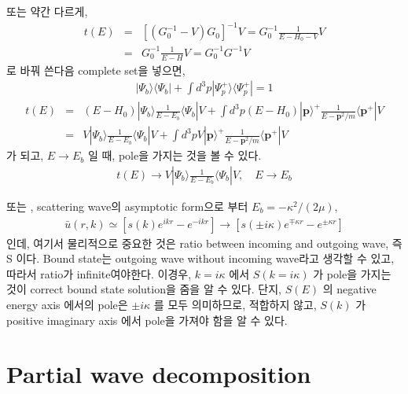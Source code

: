 \documentclass[10pt]{book}
\def\bm{\boldsymbol}
\newcommand{\bea}{\begin{eqnarray}}
\newcommand{\eea}{\end{eqnarray}}
\newcommand{\no}{\nonumber \\}
\def\vp{{\bm p}}
\def\la{\langle}
\def\ra{\rangle}
\begin{document}
또는 약간 다르게,
\bea
t(E)&=&[(G_0^{-1}-V)G_0]^{-1}V=G_0^{-1}\frac{1}{E-H_0-V}V\no 
     &=&G_0^{-1}\frac{1}{E-H}V=G_0^{-1} G^{-1} V
\eea
로 바꿔 쓴다음 complete set을 넣으면,
\bea
|\Psi_b\ra\la\Psi_b|+\int d^3 p |\Psi_p^{+}\ra\la\Psi_p^{+}|=1 
\eea
\bea
t(E)&=&(E-H_0)|\Psi_b\ra\frac{1}{E-E_b}\la \Psi_b|V
        +\int d^3p (E-H_0)|\vp\ra^+ \frac{1}{E-\vp^2/m}\la \vp^{+}| V \no
      &=&V|\Psi_b\ra\frac{1}{E-E_b}\la\Psi_b|V
         +\int d^3p V|\vp\ra^+ \frac{1}{E-\vp^2/m}\la \vp^{+}| V 
\eea
가 되고, $E\to E_b$ 일 때, pole을 가지는 것을 볼 수 있다.
\bea
t(E)\to V|\Psi_b\ra\frac{1}{E-E_b}\la\Psi_b|V, \quad E\to E_b
\eea

또는 , scattering wave의 asymptotic form으로 부터 $E_b=-\kappa^2/(2\mu)$,
\bea
\bar{u}(r,k)\simeq 
  [s(k) e^{ik r}- e^{-ik r}]
\to [s(\pm i\kappa) e^{\mp \kappa r}- e^{\pm \kappa r}]
\eea
인데, 여기서 물리적으로 중요한 것은 ratio between incoming and outgoing wave, 즉 S 이다. 
Bound state는 outgoing wave without incoming wave라고 생각할 수 있고,
따라서 ratio가 infinite여야한다. 이경우, $k=i\kappa$ 에서 $S(k=i\kappa)$ 
가 pole을 가지는 것이 
correct bound state solution을 줌을 알 수 있다. 단지, $S(E)$ 의 negative 
energy axis 에서의 pole은 $\pm i\kappa$ 를 모두 의미하므로, 적합하지 않고,
$S(k)$ 가 positive imaginary axis 에서 pole을 가져야 함을 알 수 있다.



\chapter{Partial wave decomposition}
\end{document}
